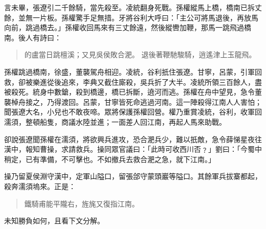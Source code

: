 言未畢，張遼引二千餘騎，當先殺至。凌統翻身死戰。孫權縱馬上橋，橋南已拆丈餘，並無一片板。孫權驚手足無措。牙將谷利大呼曰：「主公可將馬退後，再放馬向前，跳過橋去。」孫權收回馬來有三丈餘遠，然後縱轡加鞭，那馬一跳飛過橋南。後人有詩曰：

\begin{quote}
的盧當日跳檀溪；又見吳侯敗合淝。
退後著鞭馳駿騎，逍遙津上玉龍飛。
\end{quote}

孫權跳過橋南，徐盛，董襲駕舟相迎。凌統，谷利扺住張遼。甘寧，呂蒙，引軍回救，卻被樂進從後追來，李典又截住廝殺，吳兵折了大半。凌統所領三百餘人，盡被殺死。統身中數鎗，殺到橋邊，橋已拆斷，遶河而逃。孫權在舟中望見，急令董襲棹舟接之，乃得渡回。呂蒙，甘寧皆死命逃過河南。這一陣殺得江南人人害怕；聞張遼大名，小兒也不敢夜啼。眾將保護孫權回營。權乃重賞凌統，谷利，收軍回濡須，整頓船隻，商議水陸並進；一面差人回江南，再起人馬來助戰。

卻說張遼聞孫權在濡須，將欲興兵進攻，恐合淝兵少，難以扺敵，急令薛悌星夜往漢中，報知曹操，求請救兵。操同眾官議曰：「此時可收西川否﹖」劉曰：「今蜀中稍定，已有準備，不可擊也。不如撤兵去救合淝之急，就下江南。」

操乃留夏侯淵守漢中，定軍山隘口，留張郃守蒙頭巖等隘口。其餘軍兵拔寨都起，殺奔濡須塢來。正是：

\begin{quote}
鐵騎甫能平隴右，旌旄又復指江南。
\end{quote}

未知勝負如何，且看下文分解。
